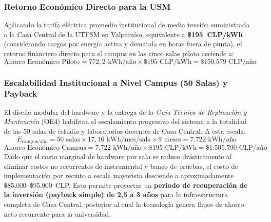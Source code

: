 \subsubsection{Retorno Económico Directo para la USM}
Aplicando la tarifa eléctrica promedio institucional de media tensión suministrada a la Casa Central de la UTFSM en Valparaíso, equivalente a \textbf{\$195~CLP/kWh} (considerando cargos por energía activa y demanda en horas fuera de punta), el retorno financiero directo para el campus en las cinco salas piloto asciende a:
\begin{equation}
    \text{Ahorro Económico Piloto} = 772{,}2\text{ kWh/año} \times \$195\text{ CLP/kWh} = \$150.579\text{ CLP/año}
\end{equation}

\subsubsection{Escalabilidad Institucional a Nivel Campus (50 Salas) y Payback}
El diseño modular del hardware y la entrega de la \textit{Guía Técnica de Replicación y Mantención} (OE4) habilitan el escalamiento progresivo del sistema a la totalidad de las 50 salas de estudio y laboratorios docentes de Casa Central. A esta escala:
\begin{equation}
    E_{\text{campus/año}} = 50\text{ salas} \times 17{,}16\text{ kWh/mes/sala} \times 9\text{ meses} = 7.722\text{ kWh/año}
\end{equation}
\begin{equation}
    \text{Ahorro Económico Campus} = 7.722\text{ kWh/año} \times \$195\text{ CLP/kWh} = \$1.505.790\text{ CLP/año}
\end{equation}
Dado que el costo marginal de hardware por sala se reduce drásticamente al eliminar costos no recurrentes de instrumental y banco de pruebas, el costo de implementación por recinto a escala mayorista desciende a aproximadamente \$85.000--\$95.000~CLP. Esto permite proyectar un \textbf{periodo de recuperación de la inversión (payback simple) de 2,5 a 3 años} para la infraestructura completa de Casa Central, posterior al cual la tecnología genera flujos de ahorro neto recurrente para la universidad.

